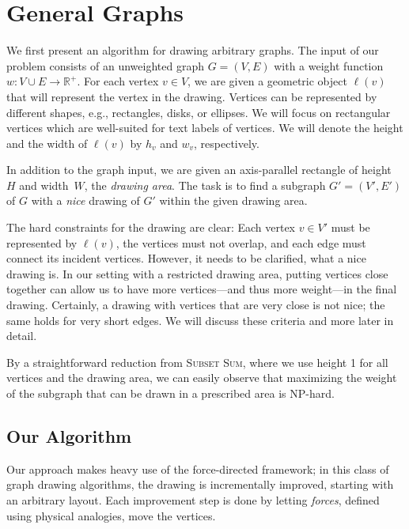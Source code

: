 \documentclass[]{llncs}
\begin{document}
\section{General Graphs}
\label{sec:general}

We first present an algorithm for drawing arbitrary graphs.
The input of our problem consists of an unweighted graph $G =
(V,E)$ with a weight function $w \colon V \cup E \to
\mathbb{R}^+$. For each vertex $v \in V$, we are given a geometric
object $\ell(v)$ that will represent the vertex in the drawing.
Vertices can be represented by different shapes, e.g., rectangles,
disks, or ellipses. We will focus on rectangular vertices which are
well-suited for text labels of vertices. We will denote the height
and the width of $\ell(v)$ by $h_v$ and $w_v$, respectively.

In addition to the graph input, we are given an axis-parallel
rectangle of height~$H$ and width~$W$, the \emph{drawing area}. The task is
to find a subgraph $G' = (V',E')$ of $G$ with a \emph{nice} drawing of
$G'$ within the given drawing area.

The hard constraints for the drawing are clear: Each vertex $v\in V'$
must be represented by $\ell(v)$, the vertices must not overlap, and
each edge must connect its incident vertices. However, it needs to be
clarified, what a nice drawing is. In our setting with a
restricted drawing area, putting vertices close together can
allow us to have more vertices---and thus more weight---in the final
drawing. Certainly, a drawing with vertices that are very close
is not nice; the same holds for very short edges. We will
discuss these criteria and more later in detail.

By a straightforward reduction from \textsc{Subset Sum}, where we use
height 1 for all vertices and the drawing area, we can easily
observe that maximizing the weight of the subgraph that can be drawn
in a prescribed area is NP-hard.


\subsection{Our Algorithm}
\label{sec:gen-algo}
Our approach makes heavy use of the force-directed framework; in this
class of graph drawing algorithms, the drawing is incrementally
improved, starting with an arbitrary layout. Each improvement step is
done by letting \emph{forces}, defined using physical analogies, move
the vertices.
\end{document}

